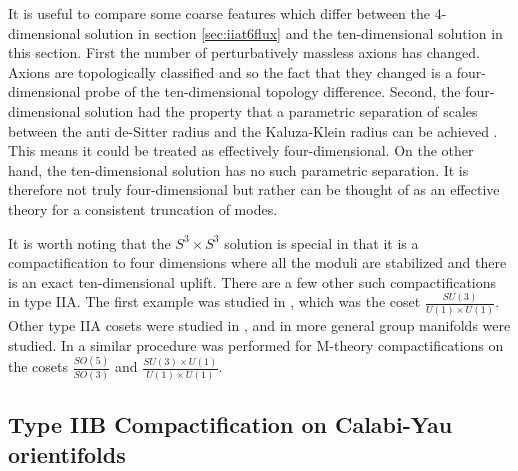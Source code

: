 \documentclass[11pt,a4paper]{article}
\numberwithin{equation}{section}
\numberwithin{table}{section}\setlength{\multlinegap}{25pt}
\begin{document}
It is useful to compare some coarse features which differ between the 4-dimensional solution in section \ref{sec:iiat6flux} and the ten-dimensional solution in this section. First the number of perturbatively massless axions has changed. Axions are topologically classified and so the fact that they changed is a four-dimensional probe of the ten-dimensional topology difference. Second, the four-dimensional solution had the property that a parametric separation of scales between the anti de-Sitter radius and the Kaluza-Klein radius can be achieved \cite{DeWolfe:2005uu}. This means it could be treated as effectively four-dimensional. On the other hand, the ten-dimensional solution has no such parametric separation. It is therefore not truly four-dimensional but rather can be thought of as an effective theory for a consistent truncation of modes. 


It is worth noting that the $S^3 \times S^3$ solution is special in that it is a compactification to four dimensions where all the moduli are stabilized and there is an exact ten-dimensional uplift. There are a few other such compactifications in type IIA. The first example was studied in \cite{House:2005yc}, which was the coset $\frac{SU(3)}{U(1)\times U(1)}$. Other type IIA cosets were studied in \cite{Caviezel:2008ik,Koerber:2008rx,Cassani:2009ck}, and in \cite{Grana:2006kf} more general group manifolds were studied. In \cite{Micu:2006ey} a similar procedure was performed for M-theory compactifications on the cosets $\frac{SO(5)}{SO(3)}$ and $\frac{SU(3)\times U(1)}{U(1)\times U(1)}$.

\subsection{Type IIB Compactification on Calabi-Yau orientifolds}
\label{sec:typeiibor}
\end{document}
